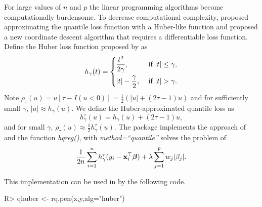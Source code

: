 \documentclass[article]{rqPenVignette}%
\newcommand{\vx}{{\bf x}}
\newcommand{\vbeta}{\mbox{\boldmath $\beta$}}
\begin{document}
For large values of $n$ and $p$ the linear programming algorithms become computationally burdensome. To decrease computational complexity, \citet{huber_cd} proposed approximating the quantile loss function with a Huber-like function and proposed a new coordinate descent algorithm that requires a differentiable loss function. Define the Huber loss function proposed by \citet{huber1964} as
\begin{eqnarray*}
	h_\gamma(t) = \begin{dcases}
		\frac{t^2}{2\gamma}, & \mbox{ if } |t| \leq \gamma,\\
		|t|-\frac{\gamma}{2}, & \mbox{ if } |t| > \gamma.
	\end{dcases}
\end{eqnarray*}
Note $\rho_\tau(u) = u[\tau-I(u<0)]=\frac{1}{2}(|u|+(2\tau-1)u)$ and for sufficiently small $\gamma$, $|u| \approx h_\gamma(u)$. We define the Huber-approximated quantile loss as
\begin{equation}
\label{huber_quantile}
h_{\gamma}^{\tau}(u) = h_\gamma(u) + (2\tau-1)u,
\end{equation}
and for small $\gamma$, $\rho_\tau(u) \approx \frac{1}{2}h_{\gamma}^{\tau}(u)$. The package  implements the approach of \citet{huber_cd} and the function \emph{hqreg()}, with \emph{method=``quantile''} solves the problem of
\begin{equation}
\label{huberLasso}
\frac{1}{2n} \sum_{i=1}^n h_{\gamma}^{\tau}(y_i - \vx_i^\top\vbeta) +  \lambda \sum_{j=1}^p w_j|\beta_j|.
\end{equation}

This implementation can be used in  by the following code.   

\begin{Schunk}
\begin{Sinput}
R> qhuber <- rq.pen(x,y,alg="huber")
\end{Sinput}
\end{Schunk}
\end{document}
